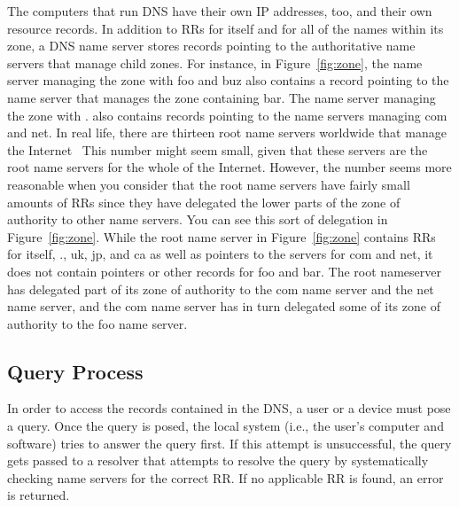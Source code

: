 \documentclass[11pt,a4paper]{article}
\begin{document}
The computers that run DNS have their own IP addresses, too, and their own 
resource records. In
addition to RRs for itself and for all of the names within its zone, a
DNS name server stores records pointing to the authoritative name
servers that manage child zones. For instance, in Figure~\ref{fig:zone}, the
name server managing the zone with foo and buz also contains a record
pointing to the name server that manages the zone containing bar. The
name server managing the zone with . also contains records pointing to
the name servers managing com and net. In real life, there are thirteen
root name servers worldwide that manage the Internet~\cite{DNS}
This number might seem small, given that these servers are the root name
servers for the whole of the Internet. However, the number seems more
reasonable when you consider that the root name servers have fairly
small amounts of RRs since they have delegated the lower parts of the
zone of authority to other name servers. You can see this sort of
delegation in Figure~\ref{fig:zone}. While the root name server in 
Figure~\ref{fig:zone} contains RRs for itself, ., uk, jp, and ca as well as
pointers to the servers for com and net, it does not contain pointers or
other records for foo and bar. The root nameserver has delegated part of
its zone of authority to the com name server and the net name server,
and the com name server has in turn delegated some of its zone of
authority to the foo name server.

\subsection{Query Process}
\indent\indent In order to access the records contained in the DNS, a user or a device must pose a query.
Once the query is posed, the local system (i.e., the user's computer and software) tries to answer the query first. 
If this attempt is unsuccessful, the query gets passed to a resolver that attempts to resolve the query by systematically checking name servers for the correct RR. 
If no applicable RR is found, an error is returned. 
\end{document}
